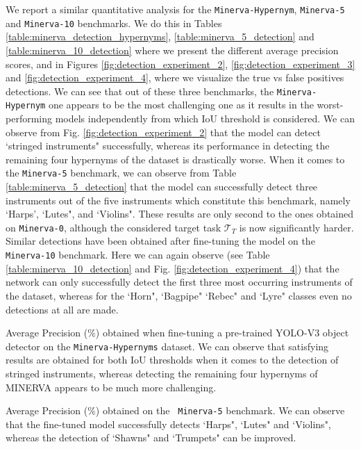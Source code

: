 We report a similar quantitative analysis for the \texttt{Minerva-Hypernym}, \texttt{Minerva-5} and \texttt{Minerva-10} benchmarks. We do this in Tables \ref{table:minerva_detection_hypernyms}, \ref{table:minerva_5_detection} and \ref{table:minerva_10_detection} where we present the different average precision scores, and in Figures \ref{fig:detection_experiment_2}, \ref{fig:detection_experiment_3} and \ref{fig:detection_experiment_4}, where we visualize the true vs false positives detections. We can see that out of these three benchmarks, the \texttt{Minerva-Hypernym} one appears to be the most challenging one as it results in the worst-performing models independently from which IoU threshold is considered. We can observe from Fig. \ref{fig:detection_experiment_2} that the model can detect `stringed instruments" successfully, whereas its performance in detecting the remaining four hypernyms of the dataset is drastically worse. When it comes to the \texttt{Minerva-5} benchmark, we can observe from Table \ref{table:minerva_5_detection} that the model can successfully detect three instruments out of the five instruments which constitute this benchmark, namely `Harps', `Lutes", and `Violins". These results are only second to the ones obtained on \texttt{Minerva-0}, although the considered target task $\mathcal{T}_T$ is now significantly harder. Similar detections have been obtained after fine-tuning the model on the \texttt{Minerva-10} benchmark. Here we can again observe (see Table \ref{table:minerva_10_detection} and Fig. \ref{fig:detection_experiment_4}) that the network can only successfully detect the first three most occurring instruments of the dataset, whereas for the `Horn", `Bagpipe" `Rebec" and `Lyre" classes even no detections at all are made. 

\begin{table}[ht!]
	\caption{Average Precision ($\%$) obtained when fine-tuning a pre-trained YOLO-V3 object detector on the \texttt{Minerva-Hypernyms} dataset. We can observe that satisfying results are obtained for both IoU thresholds when it comes to the detection of stringed instruments, whereas detecting the remaining four hypernyms of MINERVA appears to be much more challenging.}
\resizebox{\columnwidth}{!}{%
}
\label{table:minerva_detection_hypernyms}
\end{table}


\begin{table}[ht!]
	\caption{Average Precision ($\%$) obtained on the \texttt{ Minerva-5} benchmark. We can observe that the fine-tuned model successfully detects `Harps", `Lutes" and `Violins", whereas the detection of `Shawns" and `Trumpets" can be improved.}
\resizebox{\columnwidth}{!}{%
}
\label{table:minerva_5_detection}
\end{table}


